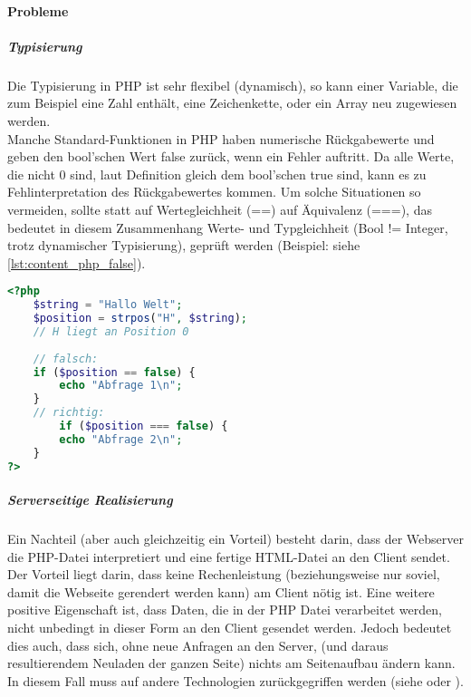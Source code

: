 \paragraph{Probleme\\}
\subparagraph{Typisierung\\} 
Die Typisierung in PHP ist sehr flexibel (dynamisch), so kann einer Variable, die zum Beispiel eine Zahl enthält, 
eine Zeichenkette, oder ein Array neu zugewiesen werden. \\
Manche Standard-Funktionen in PHP haben numerische Rückgabewerte und geben den bool'schen Wert false zurück, 
wenn ein Fehler auftritt. Da alle Werte, die nicht 0 sind, laut Definition gleich dem bool'schen true sind, 
kann es zu Fehlinterpretation des Rückgabewertes kommen. Um solche Situationen so vermeiden, sollte statt auf Wertegleichheit (==) auf Äquivalenz (===), das bedeutet in diesem Zusammenhang Werte- und Typgleichheit (Bool != Integer, trotz dynamischer Typisierung), geprüft werden (Beispiel: siehe \autoref{lst:content_php_false}).
\begin{lstlisting}[style=custom, language=PHP,  caption={Typisierungsproblem},label={lst:content_php_false}]
<?php 
	$string = "Hallo Welt";
	$position = strpos("H", $string); 
	// H liegt an Position 0
	
	// falsch:
	if ($position == false) {
		echo "Abfrage 1\n";
	}
	// richtig:
		if ($position === false) {
		echo "Abfrage 2\n";
	}
?>
\end{lstlisting}
\subparagraph{Serverseitige Realisierung\\}
Ein Nachteil (aber auch gleichzeitig ein Vorteil) besteht darin, dass der Webserver die PHP-Datei interpretiert und eine fertige HTML-Datei an den Client sendet. Der Vorteil liegt darin, dass keine Rechenleistung (beziehungsweise nur soviel, damit die Webseite gerendert werden kann) am Client nötig ist. Eine weitere positive Eigenschaft ist, dass Daten, die in der PHP Datei verarbeitet werden, nicht unbedingt in dieser Form an den Client gesendet werden. 
Jedoch bedeutet dies auch, dass sich, ohne neue Anfragen an den Server, (und daraus resultierendem Neuladen der ganzen Seite) nichts am Seitenaufbau ändern kann.
In diesem Fall muss auf andere Technologien zurückgegriffen werden (siehe  oder ).


